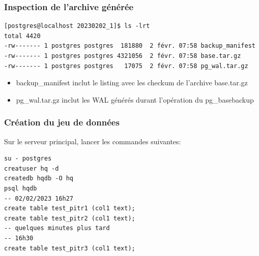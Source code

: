 
\begin{frame}[fragile]\frametitle{Inspection de l'archive générée}

\begin{tiny}
\begin{verbatim}
[postgres@localhost 20230202_1]$ ls -lrt
total 4420
-rw------- 1 postgres postgres  181880  2 févr. 07:58 backup_manifest
-rw------- 1 postgres postgres 4321056  2 févr. 07:58 base.tar.gz
-rw------- 1 postgres postgres   17075  2 févr. 07:58 pg_wal.tar.gz
\end{verbatim}
\end{tiny}

\begin{itemize}
   \item backup\_manifest inclut le listing avec les checkum de l'archive base.tar.gz
   \item pg\_wal.tar.gz inclut les WAL générés durant l'opération du pg\_basebackup
\end{itemize}

\end{frame}


\begin{frame}[fragile]\frametitle{Création du jeu de données}

Sur le serveur principal, lancer les commandes suivantes:

\begin{tiny}
\begin{verbatim}
su - postgres
creatuser hq -d
createdb hqdb -O hq
psql hqdb
-- 02/02/2023 16h27
create table test_pitr1 (col1 text);
create table test_pitr2 (col1 text);
-- quelques minutes plus tard
-- 16h30
create table test_pitr3 (col1 text);
\end{verbatim}
\end{tiny}

\begin{toile}
\end{toile}


\end{frame}


